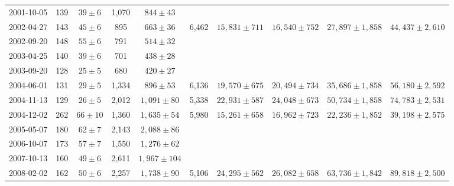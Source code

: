 \documentclass[12pt,letterpaper]{article}
\begin{document}
\begin{landscape}
\begin{longtable}{cccccccccc}
 {2001-10-05} &  139 &    {$39  \pm  6$} &  1,070 &     {$844 \pm 43$} &        &                       &                       &                       &                       \\
 {2002-04-27} &  143 &    {$45  \pm  6$} &    895 &     {$663 \pm 36$} &  6,462 &    {$15,831 \pm 711$} &    {$16,540 \pm 752$} &  {$27,897 \pm 1,858$} &  {$44,437 \pm 2,610$} \\
 {2002-09-20} &  148 &    {$55  \pm  6$} &    791 &     {$514 \pm 32$} &        &                       &                       &                       &                       \\
 {2003-04-25} &  140 &    {$39  \pm  6$} &    701 &     {$438 \pm 28$} &        &                       &                       &                       &                       \\
 {2003-09-20} &  128 &    {$25  \pm  5$} &    680 &     {$420 \pm 27$} &        &                       &                       &                       &                       \\
 {2004-06-01} &  131 &    {$29  \pm  5$} &  1,334 &     {$896 \pm 53$} &  6,136 &    {$19,570 \pm 675$} &    {$20,494 \pm 734$} &  {$35,686 \pm 1,858$} &  {$56,180 \pm 2,592$} \\
 {2004-11-13} &  129 &    {$26  \pm  5$} &  2,012 &   {$1,091 \pm 80$} &  5,338 &    {$22,931 \pm 587$} &    {$24,048 \pm 673$} &  {$50,734 \pm 1,858$} &  {$74,783 \pm 2,531$} \\
 {2004-12-02} &  262 &   {$66  \pm  10$} &  1,360 &   {$1,635 \pm 54$} &  5,980 &    {$15,261 \pm 658$} &    {$16,962 \pm 723$} &  {$22,236 \pm 1,852$} &  {$39,198 \pm 2,575$} \\
 {2005-05-07} &  180 &    {$62  \pm  7$} &  2,143 &   {$2,088 \pm 86$} &        &                       &                       &                       &                       \\
 {2006-10-07} &  173 &    {$57  \pm  7$} &  1,550 &   {$1,276 \pm 62$} &        &                       &                       &                       &                       \\
 {2007-10-13} &  160 &    {$49  \pm  6$} &  2,611 &  {$1,967 \pm 104$} &        &                       &                       &                       &                       \\
 {2008-02-02} &  162 &    {$50  \pm  6$} &  2,257 &   {$1,738 \pm 90$} &  5,106 &    {$24,295 \pm 562$} &    {$26,082 \pm 658$} &  {$63,736 \pm 1,842$} &  {$89,818 \pm 2,500$} \\

\end{longtable}
\end{landscape}
\end{document}
